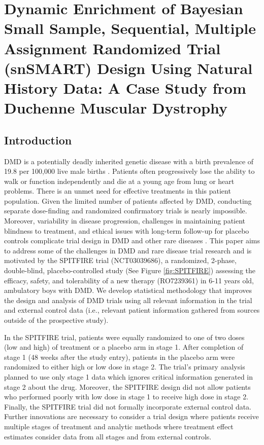 \chapter{Dynamic Enrichment of Bayesian Small Sample, Sequential, Multiple Assignment Randomized Trial (snSMART) Design Using Natural History Data: A Case Study from Duchenne Muscular Dystrophy}
\label{chpt:chpt2}

\section{Introduction}
\label{s:intro}
\ac{DMD} is a potentially deadly inherited genetic disease with a birth prevalence of 19.8 per 100,000 live male births \citep{crisafulli2020global}. Patients often progressively lose the ability to walk or function independently and die at a young age from lung or heart problems. There is an unmet need for effective treatments in this patient population. Given the limited number of patients affected by \ac{DMD}, conducting separate dose-finding and randomized confirmatory trials is nearly impossible. Moreover, variability in disease progression, challenges in maintaining patient blindness to treatment, and ethical issues with long-term follow-up for placebo controls complicate trial design in \ac{DMD} and other rare diseases \citep{MUNTONI2022271}. This paper aims to address some of the challenges in \ac{DMD} and rare disease trial research and is motivated by the SPITFIRE trial (NCT03039686), a randomized, 2-phase, double-blind, placebo-controlled study (See Figure \ref{fig:SPITFIRE}) assessing the efficacy, safety, and tolerability of a new therapy (RO7239361) in 6-11 years old, ambulatory boys with \ac{DMD}.  We develop statistical methodology that improves the design and analysis of \ac{DMD} trials using all relevant information in the trial and external control data (i.e., relevant patient information gathered from sources outside of the prospective study).

In the SPITFIRE trial, patients were equally randomized to one of two doses (low and high) of treatment or a placebo arm in stage 1. After completion of stage 1 (48 weeks after the study entry), patients in the placebo arm were randomized to either high or low dose in stage 2. The trial's primary analysis planned to use only stage 1 data which ignores critical information generated in stage 2 about the drug. Moreover, the SPITFIRE design did not allow patients who performed poorly with low dose in stage 1 to receive high dose in stage 2. Finally, the SPITFIRE trial did not formally incorporate external control data. Further innovations are necessary to consider a trial design where patients receive multiple stages of treatment and analytic methods where treatment effect estimates consider data from all stages and from external controls.

